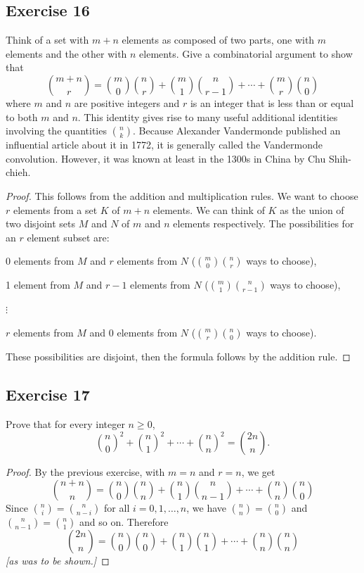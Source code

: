 \documentclass[14pt]{extarticle}
\begin{document}
\subsection{Exercise 16}
Think of a set with \(m + n\) elements as composed of two parts, one with \(m\) elements and the other with \(n\)
elements. Give a combinatorial argument to show that
\[
     \binom{m+n}{r} = \binom{m}{0}\binom{n}{r} + \binom{m}{1}\binom{n}{r-1} + \cdots + \binom{m}{r}\binom{n}{0}
\]
where \(m\) and \(n\) are positive integers and \(r\) is an integer that is less than or equal to both \(m\) and \(n\).
This identity gives rise to many useful additional identities involving the quantities \(\binom{n}{k}\). Because Alexander
Vandermonde published an influential article about it in 1772, it is generally called the Vandermonde convolution. However, it was known at least in the 1300s in China by Chu Shih-chieh.

\begin{proof}
     This follows from the addition and multiplication rules. We want to choose \(r\) elements from a set \(K\) of \(m+n\)
     elements. We can think of \(K\) as the union of two disjoint sets \(M\) and \(N\) of \(m\) and \(n\) elements respectively.
     The possibilities for an \(r\) element subset are:

     0 elements from \(M\) and \(r\) elements from \(N\) (\(\binom{m}{0}\binom{n}{r}\) ways to choose),

     1 element from \(M\) and \(r-1\) elements from \(N\) (\(\binom{m}{1}\binom{n}{r-1}\) ways to choose),

     \(\vdots\)

     \(r\) elements from \(M\) and 0 elements from \(N\) (\(\binom{m}{r}\binom{n}{0}\) ways to choose).

     These possibilities are disjoint, then the formula follows by the addition rule.
\end{proof}

\subsection{Exercise 17}
Prove that for every integer \(n \geq 0\),
\[
     \binom{n}{0}^2 + \binom{n}{1}^2 + \cdots + \binom{n}{n}^2 = \binom{2n}{n}.
\]
\begin{proof}
     By the previous exercise, with \(m=n\) and \(r=n\), we get
     \[
          \binom{n+n}{n} = \binom{n}{0}\binom{n}{n} + \binom{n}{1}\binom{n}{n-1} + \cdots + \binom{n}{n}\binom{n}{0}
     \]
     Since \(\binom{n}{i} = \binom{n}{n-i}\) for all \(i = 0, 1, \ldots, n\), we have \(\binom{n}{n} = \binom{n}{0}\) and
     \(\binom{n}{n-1} = \binom{n}{1}\) and so on. Therefore
     \[
          \binom{2n}{n} = \binom{n}{0}\binom{n}{0} + \binom{n}{1}\binom{n}{1} + \cdots + \binom{n}{n}\binom{n}{n}
     \]
     {\it [as was to be shown.]}
\end{proof}
\end{document}
